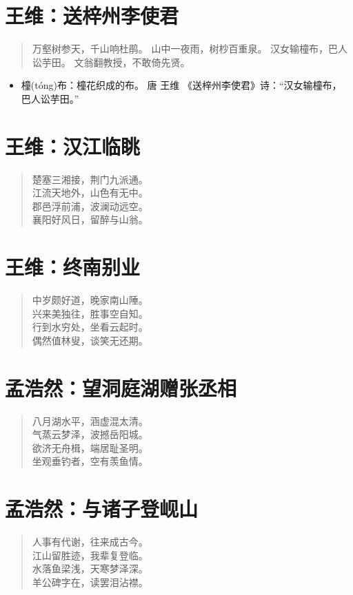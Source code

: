 \documentclass[12pt,oneside]{book}
\newenvironment{shici}{%
\begin{verse}\centering\yanti\large\hspace{12pt}}{\end{verse}}
\begin{document}
\begin{common-format}
\chapter{王维：送梓州李使君}
\begin{shici}
万壑树参天，千山响杜鹃。
山中一夜雨，树杪百重泉。
汉女输橦布，巴人讼芋田。
文翁翻教授，不敢倚先贤。
\end{shici}

\begin{itemize}
\item 橦(tóng)布：橦花织成的布。 唐 王维 《送梓州李使君》诗：“汉女输橦布， 巴人讼芋田。”
\end{itemize}


\chapter{王维：汉江临眺}
\begin{shici}
楚塞三湘接，荆门九派通。\\
江流天地外，山色有无中。\\
郡邑浮前浦，波澜动远空。\\
襄阳好风日，留醉与山翁。
\end{shici}

\chapter{王维：终南别业}
\begin{shici}
中岁颇好道，晚家南山陲。\\
兴来美独往，胜事空自知。\\
行到水穷处，坐看云起时。\\
偶然值林叟，谈笑无还期。
\end{shici}

\chapter{孟浩然：望洞庭湖赠张丞相}
\begin{shici}
八月湖水平，涵虚混太清。\\
气蒸云梦泽，波撼岳阳城。\\
欲济无舟楫，端居耻圣明。\\
坐观垂钓者，空有羡鱼情。
\end{shici}

\chapter{孟浩然：与诸子登岘山}
\begin{shici}
人事有代谢，往来成古今。\\
江山留胜迹，我辈复登临。\\
水落鱼梁浅，天寒梦泽深。\\
羊公碑字在，读罢泪沾襟。
\end{shici}


\end{common-format}
\end{document}
